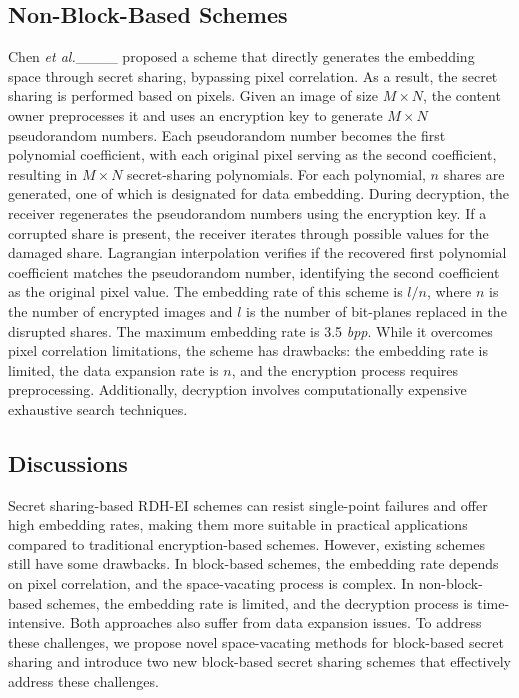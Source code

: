 \subsection{Non-Block-Based Schemes}
Chen \textit{et al.}____ proposed a scheme that directly generates the embedding space through secret sharing, bypassing pixel correlation. As a result, the secret sharing is performed based on pixels. Given an image of size $M \times N$, the content owner preprocesses it and uses an encryption key to generate $M \times N$ pseudorandom numbers. Each pseudorandom number becomes the first polynomial coefficient, with each original pixel serving as the second coefficient, resulting in $M \times N$ secret-sharing polynomials. For each polynomial, $n$ shares are generated, one of which is designated for data embedding. During decryption, the receiver regenerates the pseudorandom numbers using the encryption key. If a corrupted share is present, the receiver iterates through possible values for the damaged share. Lagrangian interpolation verifies if the recovered first polynomial coefficient matches the pseudorandom number, identifying the second coefficient as the original pixel value. The embedding rate of this scheme is $l/n$, where $n$ is the number of encrypted images and $l$ is the number of bit-planes replaced in the disrupted shares. The maximum embedding rate is 3.5 \textit{bpp}. While it overcomes pixel correlation limitations, the scheme has drawbacks: the embedding rate is limited, the data expansion rate is $n$, and the encryption process requires preprocessing. Additionally, decryption involves computationally expensive exhaustive search techniques.

\subsection{Discussions}
Secret sharing-based RDH-EI schemes can resist single-point failures and offer high embedding rates, making them more suitable in practical applications compared to traditional encryption-based schemes. However, existing schemes still have some drawbacks. In block-based schemes, the embedding rate depends on pixel correlation, and the space-vacating process is complex. In non-block-based schemes, the embedding rate is limited, and the decryption process is time-intensive. Both approaches also suffer from data expansion issues. To address these challenges, we propose novel space-vacating methods for block-based secret sharing and introduce two new block-based secret sharing schemes that effectively address these challenges.

